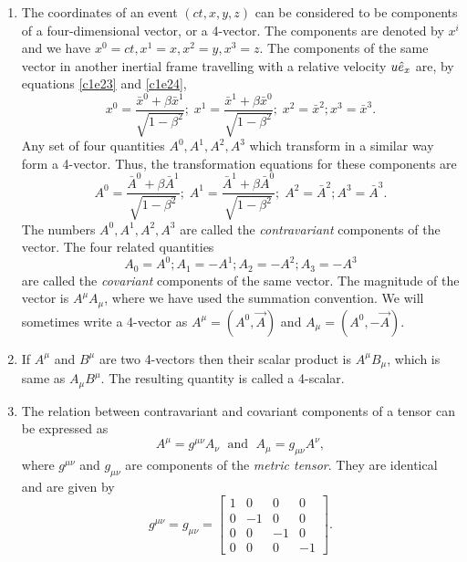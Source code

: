 \begin{enumerate}
\item The coordinates of an event $(ct, x, y, z)$ can be considered to be
components of a four-dimensional vector, or a 4-vector. The components are
denoted by $x^i$ and we have $x^0 = ct, x^1 = x, x^2 = y, x^3 = z$. The 
components of the same vector in another inertial frame travelling with a 
relative velocity $u\hat{e}_{x}$ are, by equations \eqref{c1e23} and \eqref{c1e24},
\[
x^0 = \frac{\bar{x}^0 + \beta\bar{x}^1}{\sqrt{1 - \beta^2}};\;
x^1 = \frac{\bar{x}^1 + \beta\bar{x}^0}{\sqrt{1 - \beta^2}};\;
x^2 = \bar{x}^2; x^3 = \bar{x}^3.
\]
Any set of four quantities $A^0, A^1, A^2, A^3$ which transform in a similar
way form a 4-vector. Thus, the transformation equations for these components
are
\begin{equation}\label{c1e46}
A^0 = \frac{\bar{A}^0 + \beta\bar{A}^1}{\sqrt{1 - \beta^2}};\;
A^1 = \frac{\bar{A}^1 + \beta\bar{A}^0}{\sqrt{1 - \beta^2}};\;
A^2 = \bar{A}^2; A^3 = \bar{A}^3.
\end{equation}
The numbers $A^0, A^1, A^2, A^3$ are called the \emph{contravariant} components
of the vector. The four related quantities
\begin{equation}\label{c1e47}
A_0 = A^0; A_1 = -A^1; A_2 = -A^2; A_3 = -A^3
\end{equation}
are called the \emph{covariant} components of the same vector. The magnitude of
the vector is $A^\mu A_\mu$, where we have used the summation convention. We will 
sometimes write a 4-vector as $A^\mu = (A^0, \vec{A})$ and $A_\mu = (A^0, -\vec{A})$.

\item If $A^\mu$ and $B^\mu$ are two 4-vectors then their scalar product is $A^\mu 
B_\mu$, which is same as $A_\mu B^\mu$. The resulting quantity is called a 4-scalar. 

\item The relation between contravariant and covariant components of a tensor
can be expressed as
\begin{equation}\label{c1e48}
A^\mu = g^{\mu\nu}A_\nu\;\text{ and }\; A_\mu = g_{\mu\nu}A^\nu,
\end{equation}
where $g^{\mu\nu}$ and $g_{\mu\nu}$ are components of the \emph{metric tensor}. 
They are identical and are given by
\begin{equation}\label{c1e49}
g^{\mu\nu} = g_{\mu\nu} = \begin{bmatrix}1 & 0 & 0 & 0 \\
0 & -1 & 0 & 0 \\
0 & 0 & -1 & 0 \\
0 & 0 & 0 & -1
\end{bmatrix}.
\end{equation}


\end{enumerate}
